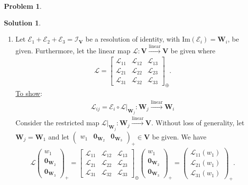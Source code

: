 \documentclass{article}
\theoremstyle{definition}
\newtheorem*{prob*}{Problem}
\newtheorem*{sln*}{Solution}
\newcommand{\V}{\mathbf{V}}
\newcommand{\W}{\mathbf{W}}
\newcommand{\lag}{\mathcal{L}}
\newcommand{\E}{\mathcal{E}}
\newcommand{\ima}{\text{Im}}
\newcommand{\lin}{\overset{\text{linear}}{\longrightarrow}}
\begin{document}
\begin{prob*}
\begin{sln*}
\begin{enumerate}
			
			
			
			
			
			
			
			\newpage
			
			
			
			
			
			\item Let $\E_1 + \E_2 + \E_3 = \mathcal{I}_\V$ be a resolution of identity, with $\ima(\E_i) = \W_i$, be given. Furthermore, let the linear map $\lag : \V \lin \V$ be given where
			\begin{align*}
			\lag = \begin{bmatrix}
			\lag_{11} & \lag_{12} & \lag_{13}\\
			\lag_{21} & \lag_{22} & \lag_{23}\\
			\lag_{31} & \lag_{32} & \lag_{33}
			\end{bmatrix}_\oplus.
			\end{align*} 
			\underline{To show}: 
			\begin{align*}
			\boxed{\lag_{ij} =  \E_{i} \circ \lag\bigg\vert_{\W_j} : \W_j \lin \W_i}
			\end{align*}
			Consider the restricted map $\lag\big\vert_{\W_j} : \W_j \lin \V$. Without loss of generality, let $\W_j = \W_1$ and let
			$\begin{pmatrix}
			w_1 & \mathbf{0}_{\W_2} & \mathbf{0}_{\W_3}
			\end{pmatrix}_+ \in \V$ be given. We have 
			\begin{align*}
			\lag \begin{pmatrix}
			w_1\\ \mathbf{0}_{\W_2} \\ \mathbf{0}_{\W_3}
			\end{pmatrix}_+
			= 
			\begin{bmatrix}
			\lag_{11} & \lag_{12} & \lag_{13}\\
			\lag_{21} & \lag_{22} & \lag_{23}\\
			\lag_{31} & \lag_{32} & \lag_{33}
			\end{bmatrix}_\oplus \begin{pmatrix}
			w_1\\ \mathbf{0}_{\W_2} \\ \mathbf{0}_{\W_3}
			\end{pmatrix}_+ = 
			\begin{pmatrix}
			\lag_{11}(w_1)\\
			\lag_{21}(w_1)\\
			\lag_{31}(w_1)
			\end{pmatrix}_+.

\end{align*}
\end{enumerate}
\end{sln*}
\end{prob*}
\end{document}
